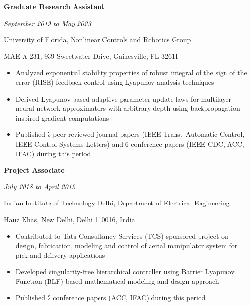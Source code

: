 \documentclass[10pt, letterpaper]{article}
\begin{document}
\vspace{0.25 cm}

\textbf{Graduate Research Assistant}

\textit{September 2019 to May 2023}

University of Florida, Nonlinear Controls and Robotics Group

MAE-A 231, 939 Sweetwater Drive, Gainesville, FL 32611

\begin{itemize}[noitemsep]
    \item Analyzed exponential stability properties of robust integral of the sign of the error (RISE) feedback control using Lyapunov analysis techniques
    \item Derived Lyapunov-based adaptive parameter update laws for multilayer neural network approximators with arbitrary depth using backpropagation-inspired gradient computations
    \item Published 3 peer-reviewed journal papers (IEEE Trans.\ Automatic Control, IEEE Control Systems Letters) and 6 conference papers (IEEE CDC, ACC, IFAC) during this period
\end{itemize}

\vspace{0.25 cm}

\textbf{Project Associate}

\textit{July 2018 to April 2019}

Indian Institute of Technology Delhi, Department of Electrical Engineering

Hauz Khas, New Delhi, Delhi 110016, India

\begin{itemize}[noitemsep]
    \item Contributed to Tata Consultancy Services (TCS) sponsored project on design, fabrication, modeling and control of aerial manipulator system for pick and delivery applications
    \item Developed singularity-free hierarchical controller using Barrier Lyapunov Function (BLF) based mathematical modeling and design approach
    \item Published 2 conference papers (ACC, IFAC) during this period
\end{itemize}
\end{document}
